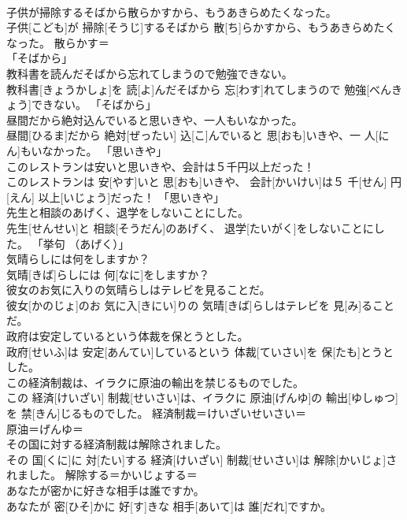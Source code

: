 \documentclass[8pt]{extreport}
\begin{document}
\begin{CJK}{UTF8}{min}
\\	子供が掃除するそばから散らかすから、もうあきらめたくなった。	
\\	子供[こども]が 掃除[そうじ]するそばから 散[ち]らかすから、もうあきらめたくなった。	散らかす＝ 
\\	「そばから」
\\	教科書を読んだそばから忘れてしまうので勉強できない。	
\\	教科書[きょうかしょ]を 読[よ]んだそばから 忘[わす]れてしまうので 勉強[べんきょう]できない。	「そばから」
\\	昼間だから絶対込んでいると思いきや、一人もいなかった。	
\\	昼間[ひるま]だから 絶対[ぜったい] 込[こ]んでいると 思[おも]いきや、一 人[にん]もいなかった。	「思いきや」
\\	このレストランは安いと思いきや、会計は５千円以上だった！	
\\	このレストランは 安[やす]いと 思[おも]いきや、 会計[かいけい]は５ 千[せん] 円[えん] 以上[いじょう]だった！	「思いきや」
\\	先生と相談のあげく、退学をしないことにした。	
\\	先生[せんせい]と 相談[そうだん]のあげく、 退学[たいがく]をしないことにした。	「挙句 （あげく）」
\\	気晴らしには何をしますか？	
\\	気晴[きば]らしには 何[なに]をしますか？	
\\	彼女のお気に入りの気晴らしはテレビを見ることだ。	
\\	彼女[かのじょ]のお 気に入[きにい]りの 気晴[きば]らしはテレビを 見[み]ることだ。	
\\	政府は安定しているという体裁を保とうとした。	
\\	政府[せいふ]は 安定[あんてい]しているという 体裁[ていさい]を 保[たも]とうとした。	
\\	この経済制裁は、イラクに原油の輸出を禁じるものでした。	
\\	この 経済[けいざい] 制裁[せいさい]は、イラクに 原油[げんゆ]の 輸出[ゆしゅつ]を 禁[きん]じるものでした。	経済制裁＝けいざいせいさい＝ 
\\	原油＝げんゆ＝ 
\\	その国に対する経済制裁は解除されました。	
\\	その 国[くに]に 対[たい]する 経済[けいざい] 制裁[せいさい]は 解除[かいじょ]されました。	解除する＝かいじょする＝ 
\\	あなたが密かに好きな相手は誰ですか。	
\\	あなたが 密[ひそ]かに 好[す]きな 相手[あいて]は 誰[だれ]ですか。	

\end{CJK}
\end{document}
